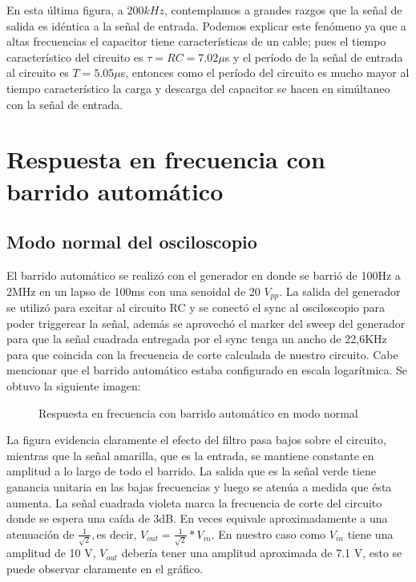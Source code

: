 En esta última figura, a $200kHz$, contemplamos a grandes razgos que la señal de salida es idéntica a la señal de entrada. Podemos explicar este fenómeno ya que a altas frecuencias el capacitor tiene características de un cable; pues el tiempo característico del circuito es $\tau = RC = 7.02\mu$s y el período de la señal de entrada al circuito es $T=5.05\mu$s, entonces como el período del circuito es mucho mayor al tiempo característico la carga y descarga del capacitor se hacen en simúltaneo con la señal de entrada. 


\section{Respuesta en frecuencia con barrido automático}

\subsection{Modo normal del osciloscopio}

El barrido automático se realizó con el generador en donde se barrió de 100Hz a 2MHz en un lapso de 100ms con una senoidal
de 20 $V_{pp}$. La salida del generador se utilizó para excitar al circuito RC y se conectó el sync al osciloscopio para poder triggerear la señal, además se aprovechó el marker del sweep del generador para que la señal cuadrada entregada por el sync tenga un ancho de 22,6KHz para que coincida con la frecuencia de corte calculada de nuestro circuito.
Cabe mencionar que el barrido automático estaba configurado en escala logarítmica. Se obtuvo la siguiente imagen:

\begin{figure}[H]
\begin{center}
\par\end{center}
\caption{Respuesta en frecuencia con barrido automático en modo normal}
\end{figure}

La figura evidencia claramente el efecto del filtro pasa bajos sobre el circuito, mientras que la señal amarilla, que es la entrada, se mantiene constante en amplitud a lo largo de todo el barrido. La salida que es la señal verde tiene ganancia unitaria en las bajas frecuencias y luego se atenúa a medida que ésta aumenta. La señal cuadrada violeta
marca la frecuencia de corte del circuito donde se espera una caída de 3dB. En veces equivale aproximadamente a una atenuación de $\frac{1}{\sqrt{2}},$es
decir, $V_{out}=\frac{1}{\sqrt{2}}*V_{in}$. En nuestro caso como $V_{in}$ tiene
una amplitud de 10 V, $V_{out}$ debería tener una amplitud aproximada de 7.1 V, esto se puede observar claramente en el gráfico.

